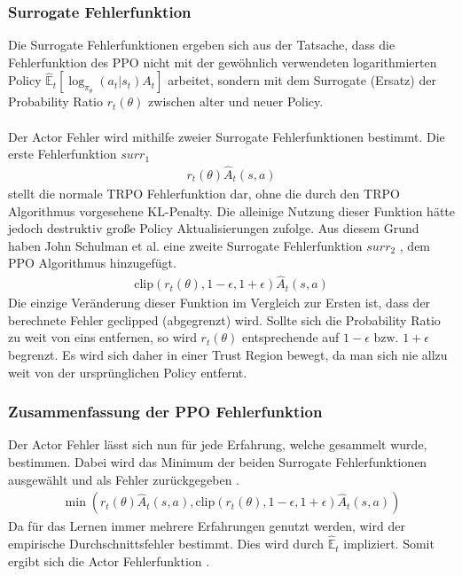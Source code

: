 \subsubsection{Surrogate Fehlerfunktion} \label{subsubsec:Grundlagen_Surrogate_Fehlerfunktion}
Die Surrogate Fehlerfunktionen ergeben sich aus der Tatsache, dass die Fehlerfunktion des PPO nicht mit der gewöhnlich verwendeten logarithmierten Policy $\mathbb{\hat{E}}_t[\log_{\pi_{\theta}}(a_t|s_t)A_t]$ arbeitet, sondern mit dem Surrogate (Ersatz) der Probability Ratio $r_{t}(\theta)$  zwischen alter und neuer Policy. \citep{TRPO}\\
\\Der Actor Fehler wird mithilfe zweier Surrogate Fehlerfunktionen bestimmt. Die erste Fehlerfunktion $surr_1$ 
\begin{align}
	\label{eq:Grundlagen_surrogate_1}
	r_{t}(\theta) \hat{A}_{t}(s, a)
\end{align}
stellt die normale TRPO Fehlerfunktion dar, ohne die durch den TRPO Algorithmus vorgesehene KL-Penalty. \citep[S. 3 f.]{PPO}
Die alleinige Nutzung dieser Funktion hätte jedoch destruktiv große Policy Aktualisierungen zufolge. Aus diesem Grund haben John Schulman et al. eine zweite Surrogate Fehlerfunktion $surr_2$ , dem PPO Algorithmus hinzugefügt. 
\begin{align}
	\label{eq:Grundlagen_surrogate_2}
	\text{clip}(r_{t}(\theta), 1 - \epsilon, 1 + \epsilon) \hat{A}_{t}(s, a)
\end{align}
Die einzige Veränderung dieser Funktion im Vergleich zur Ersten ist, dass der berechnete Fehler geclipped (abgegrenzt) wird. Sollte sich die Probability Ratio zu weit von eins entfernen, so wird $r_{t}(\theta)$ entsprechende auf $1 - \epsilon \text{ bzw. } 1 + \epsilon$ begrenzt. Es wird sich daher in einer Trust Region bewegt, da man sich nie allzu weit von der ursprünglichen Policy entfernt. \citep{TRPO, PPO}

\subsubsection{Zusammenfassung der PPO Fehlerfunktion} \label{subsubsec:Grundlagen_PPO_Actor_Loss}
Der Actor Fehler lässt sich nun für jede Erfahrung, welche gesammelt wurde, bestimmen. Dabei wird das Minimum der beiden Surrogate Fehlerfunktionen ausgewählt und als Fehler zurückgegeben .
\begin{align}
	\min(r_{t}(\theta) \hat{A}_{t}(s, a), \text{clip}(r_{t}(\theta), 1 - \epsilon, 1 + \epsilon) \hat{A}_{t}(s, a))
	\label{eq:Grundlagen_Actor_Loss_Single}
\end{align}
Da für das Lernen immer mehrere Erfahrungen genutzt werden, wird der empirische Durchschnittsfehler bestimmt. Dies wird durch $\mathbb{\hat{E}}_{t}$ impliziert. Somit ergibt sich die Actor Fehlerfunktion . \citep[S. 3f.]{PPO}\\

